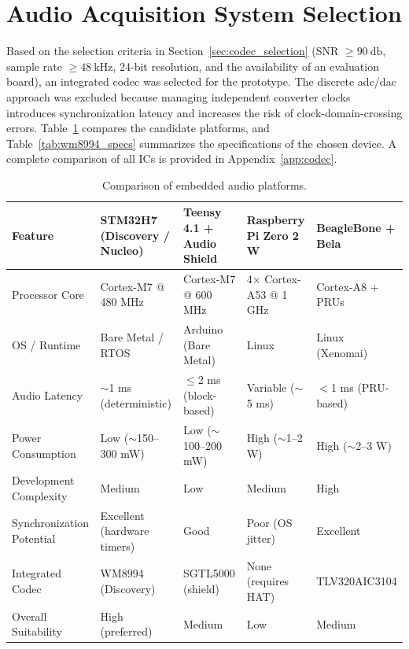 \section{Audio Acquisition System Selection}
\label{sec:results_audio_selection}
Based on the selection criteria in Section~\ref{sec:codec_selection} (SNR $\ge \SI{90}{\decibel}$, sample rate $\ge \SI{48}{\kilo\hertz}$, 24-bit resolution, and the availability of an evaluation board), an integrated codec was selected for the prototype. The discrete \acrshort{adc}/\acrshort{dac} approach was excluded because managing independent converter clocks introduces synchronization latency and increases the risk of clock-domain-crossing errors. Table~\ref{tab:platform_comparison} compares the candidate platforms, and Table~\ref{tab:wm8994_specs} summarizes the specifications of the chosen device. A complete comparison of all ICs is provided in Appendix~\ref{app:codec}.

\begin{table}[h]
\centering
\small
\renewcommand{\arraystretch}{1.2}
\begin{tabular}{p{2.2cm} p{2.2cm} p{2.2cm} p{2.2cm} p{2.2cm}}
\hline
\textbf{Feature}
& \textbf{STM32H7 (Discovery / Nucleo)}
& \textbf{Teensy 4.1 + Audio Shield}
& \textbf{Raspberry Pi Zero 2 W}
& \textbf{BeagleBone + Bela} \\
\hline
Processor Core
& Cortex-M7 @ 480 MHz
& Cortex-M7 @ 600 MHz
& 4$\times$ Cortex-A53 @ 1 GHz
& Cortex-A8 + PRUs \\
OS / Runtime
& Bare Metal / RTOS
& Arduino (Bare Metal)
& Linux
& Linux (Xenomai) \\
Audio Latency
& $\sim$1 ms (deterministic)
& $\leq$2 ms (block-based)
& Variable ($\sim$5 ms)
& $<$1 ms (PRU-based) \\
Power Consumption
& Low ($\sim$150--300 mW)
& Low ($\sim$100--200 mW)
& High ($\sim$1--2 W)
& High ($\sim$2--3 W) \\
Development Complexity
& Medium
& Low
& Medium
& High \\
Synchronization Potential
& Excellent (hardware timers)
& Good
& Poor (OS jitter)
& Excellent \\
Integrated Codec
& WM8994 (Discovery)
& SGTL5000 (shield)
& None (requires HAT)
& TLV320AIC3104 \\
Overall Suitability
& High (preferred)
& Medium
& Low
& Medium \\
\hline
\end{tabular}
\caption{Comparison of embedded audio platforms.}
\label{tab:platform_comparison}
\end{table}

